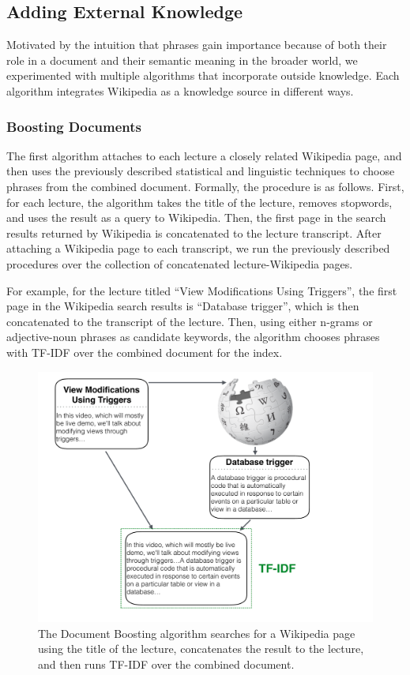 \subsection{Adding External Knowledge}
\label{sec:wiki}


Motivated by the intuition that phrases gain importance because of both their role in a document and their semantic meaning in the broader world, we experimented with multiple algorithms that incorporate outside knowledge. Each algorithm integrates Wikipedia as a knowledge source in different ways.

\subsubsection{Boosting Documents}

The first algorithm attaches to each lecture a closely related Wikipedia page, and then uses the previously described statistical and linguistic techniques to choose phrases from the combined document. Formally, the procedure is as follows. First, for each lecture, the algorithm takes the title of the lecture, removes stopwords, and uses the result as a query to Wikipedia. Then, the first page in the search results returned by Wikipedia is concatenated to the lecture transcript. After attaching a Wikipedia page to each transcript, we run the previously described procedures over the collection of concatenated lecture-Wikipedia pages.

For example, for the lecture titled ``View Modifications Using
Triggers'', the first page in the Wikipedia search results is
``Database trigger'', which is then concatenated to the transcript of
the lecture. Then, using either n-grams or adjective-noun phrases as
candidate keywords, the algorithm chooses phrases with TF-IDF over the
combined document for the index.

\begin{figure}[h!]
\caption{The Document Boosting algorithm searches for a Wikipedia page using the title of the lecture, concatenates the result to the lecture, and then runs TF-IDF over the combined document.}
\includegraphics[width=\textwidth]{document_boosting.pdf}
\end{figure}

